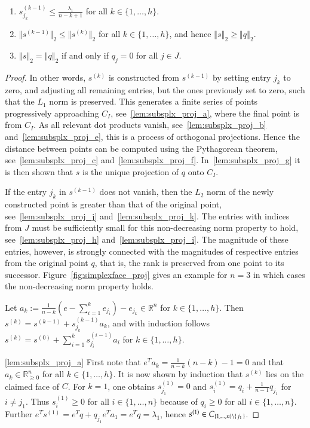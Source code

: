 \documentclass[twoside,11pt]{article}
\newcommand{\R}{\mathbb{R}}
\newcommand{\0}{\mathcal{O}}
\newcommand{\transp}{^T}
\newcommand{\norm}[1]{\left\Vert#1\right\Vert}
\newcommand{\bnorm}[1]{\big\Vert#1\big\Vert}
\newcommand{\discint}[2]{\{#1,\dotsc,#2\}}
\newcommand{\inint}[2]{\in\discint{#1}{#2}}
\begin{document}
\begin{lemma}
\begin{enumerate}[start=8]
\item \label{lem:subsplx_proj_i}
$s^{(k-1)}_{j_k} \leq \tfrac{\lambda_1}{n - k + 1}$ for all $k\inint{1}{h}$.

\item \label{lem:subsplx_proj_j}
$\bnorm{s^{(k-1)}}_2 \leq \bnorm{s^{(k)}}_2$ for all $k\inint{1}{h}$, and hence $\norm{s}_2 \geq \norm{q}_2$.

\item \label{lem:subsplx_proj_k}
$\norm{s}_2 = \norm{q}_2$ if and only if $q_j = 0$ for all $j\in J$.
\end{enumerate}
\end{lemma}
\begin{proof}
In other words, $s^{(k)}$ is constructed from $s^{(k-1)}$ by setting entry $j_k$ to zero, and adjusting all remaining entries, but the ones previously set to zero, such that the $L_1$ norm is preserved.
This generates a finite series of points progressively approaching $C_I$, see~\ref{lem:subsplx_proj_a}, where the final point is from $C_I$.
As all relevant dot products vanish, see~\ref{lem:subsplx_proj_b} and~\ref{lem:subsplx_proj_e}, this is a process of orthogonal projections.
Hence the distance between points can be computed using the Pythagorean theorem, see~\ref{lem:subsplx_proj_c} and~\ref{lem:subsplx_proj_f}.
In~\ref{lem:subsplx_proj_g} it is then shown that $s$ is the unique projection of $q$ onto $C_I$.

If the entry $j_k$ in $s^{(k-1)}$ does not vanish, then the $L_2$ norm of the newly constructed point is greater than that of the original point, see~\ref{lem:subsplx_proj_j} and~\ref{lem:subsplx_proj_k}.
The entries with indices from $J$ must be sufficiently small for this non-decreasing norm property to hold, see~\ref{lem:subsplx_proj_h} and~\ref{lem:subsplx_proj_i}.
The magnitude of these entries, however, is strongly connected with the magnitudes of respective entries from the original point $q$, that is, the rank is preserved from one point to its successor.
Figure~\ref{fig:simplexface_proj} gives an example for $n = 3$ in which cases the non-decreasing norm property holds.

Let $a_k := \tfrac{1}{n-k}\left(e - \sum\nolimits_{i=1}^k e_{j_i}\right) - e_{j_k}\in\R^n$ for $k\inint{1}{h}$.
Then $s^{(k)} = s^{(k-1)} + s^{(k-1)}_{j_k}a_k$, and with induction follows $s^{(k)} = s^{(0)} + \sum_{i=1}^k s^{(i-1)}_{j_i}a_i$ for $k\inint{1}{h}$.

\ref{lem:subsplx_proj_a}
First note that $e\transp a_k = \tfrac{1}{n-k}\left(n - k\right) - 1 = 0$ and that $a_k\in\R_{\geq 0}^n$ for all $k\inint{1}{h}$.
It is now shown by induction that $s^{(k)}$ lies on the claimed face of $C$.
For $k = 1$, one obtains $s^{(1)}_{j_1} = 0$ and $s^{(1)}_i = q_i + \tfrac{1}{n-1}q_{j_1}$ for $i\neq j_1$.
Thus $s^{(1)}_i\geq 0$ for all $i\inint{1}{n}$ because of $q_i \geq 0$ for all $i\inint{1}{n}$.
Further $e\transp s^{(1)} = e\transp q + q_{j_1}e\transp a_1 = e\transp q = \lambda_1$, hence $s^{(1)}\in C_{\discint{1}{n}\setminus\set{j_1}}$.


\end{proof}
\end{document}
